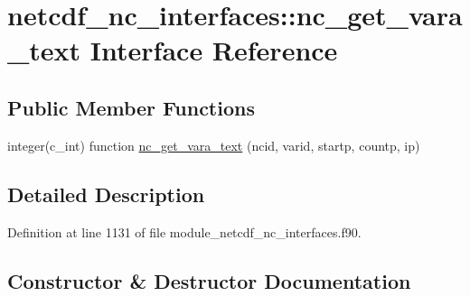 \hypertarget{interfacenetcdf__nc__interfaces_1_1nc__get__vara__text}{}\section{netcdf\+\_\+nc\+\_\+interfaces\+:\+:nc\+\_\+get\+\_\+vara\+\_\+text Interface Reference}
\label{interfacenetcdf__nc__interfaces_1_1nc__get__vara__text}
\subsection*{Public Member Functions}
\begin{DoxyCompactItemize}
\item 
integer(c\+\_\+int) function \hyperlink{interfacenetcdf__nc__interfaces_1_1nc__get__vara__text_ae68cf5e6d4854d072f1c3925b511075e}{nc\+\_\+get\+\_\+vara\+\_\+text} (ncid, varid, startp, countp, ip)
\end{DoxyCompactItemize}


\subsection{Detailed Description}


Definition at line 1131 of file module\+\_\+netcdf\+\_\+nc\+\_\+interfaces.\+f90.



\subsection{Constructor \& Destructor Documentation}
\mbox{\label{interfacenetcdf__nc__interfaces_1_1nc__get__vara__text_ae68cf5e6d4854d072f1c3925b511075e}} 
